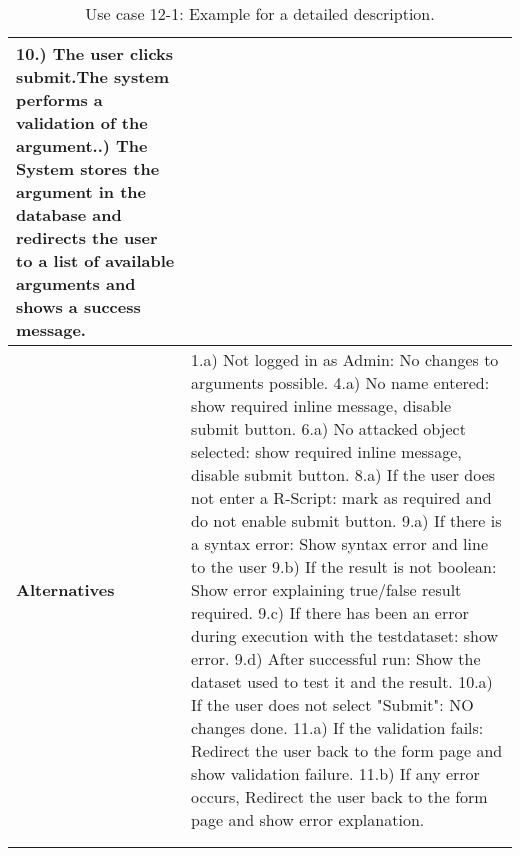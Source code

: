 {\begin{longtable}{|p{2cm} p{11cm}|}
				10.) The user clicks submit.The system performs a validation of the argument.\newline
				11.) The System stores the argument in the database and redirects the user to a list of available arguments and shows a success message.
		\\
		\hline
			\textbf{Alternatives} & 
							1.a) Not logged in as Admin: No changes to arguments possible.
				\newline	4.a) No name entered: show required inline message, disable submit button.
				\newline	6.a) No attacked object selected: show required inline message, disable submit button.
				\newline	8.a) If the user does not enter a R-Script: mark as required and do not enable submit button.
				\newline	9.a) If there is a syntax error: Show syntax error and line to the user
				\newline	9.b) If the result is not boolean: Show error explaining true/false result required.
				\newline	9.c) If there has been an error during execution with the testdataset: show error.
				\newline	9.d) After successful run: Show the dataset used to test it and the result.
				\newline	10.a) If the user does not select "Submit": NO changes done.
				\newline	11.a) If the validation fails: Redirect the user back to the form page and show validation failure.
				\newline	11.b) If any error occurs,  Redirect the user back to the form page and show error explanation.
							\\
		\hline

	\label{uc:12-1}\\
	\caption{Use case 12-1: Example for a detailed description.}
\end{longtable}
}